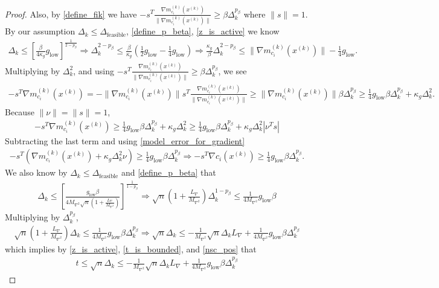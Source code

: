 \documentclass{article}
\theoremstyle{case}
\numberwithin{theorem}{subsection}
\newcommand{\dfeas}{{\Delta_{\textrm{feasible}}}}
\newcommand{\dk}{\Delta_k}
\newcommand{\gmcik}{{\nabla m_{c_i}^{(k)}\left(\xk\right)}}
\newcommand{\hgik}{{\frac{\nabla m^{(k)}_{c_i}(\xk)}{\|\nabla m^{(k)}_{c_i}(\xk)\|}}}
\newcommand{\lipgrad}{{L_{\nabla}}}
\newcommand{\maxhessian}{{M_{\nabla^2}}}
\newcommand{\mingrad}{{ g_{\textrm{low}} }}
\newcommand{\xk}{{x^{(k)}}}
\begin{document}
\begin{proof}
Also, by \cref{define_fik} we have $-s^T \hgik \ge \beta \dk^{p_{\beta}}$ where $\|s\| = 1$.
By our assumption $\dk \le \dfeas$, \cref{define_p_beta}, \cref{z_is_active} we know
\begin{align*}
\dk \le \left[\frac{\beta}{4\kappa_g}\mingrad \right]^{\frac 1 {2 - p_{\beta}}}
\Longrightarrow \dk^{2 - p_{\beta}} \le \frac{\beta}{\kappa_g}\left(\frac 1 2\mingrad  - \frac 1 4 \mingrad \right)
\Longrightarrow \frac{\kappa_g}{\beta} \dk^{2 - p_{\beta}} \le \|\gmcik\| - \frac 1 4 \mingrad.
\end{align*}
Multiplying by $\dk^2$, and using $-s^T \hgik \ge \beta \dk^{p_{\beta}}$, we see
\begin{align*}
 -s^T\gmcik =  -\|\gmcik\|s^T\hgik \ge \|\gmcik\|\beta\dk^{p_{\beta}} \ge \frac 1 4 \mingrad  \beta \dk^{p_{\beta}} + \kappa_g\dk^2.
\end{align*}
Because $\|\nu\| = \|s\| = 1$,
\begin{align*}
-s^T\gmcik \ge \frac 1 4 \mingrad  \beta \dk^{p_{\beta}} + \kappa_g\dk^2 \ge \frac 1 4 \mingrad  \beta \dk^{p_{\beta}} + \kappa_g\dk^2|\nu^T s|
\end{align*}
Subtracting the last term and using \cref{model_error_for_gradient}
\begin{align}
-s^T\left(\gmcik + \kappa_g\dk^2\nu\right) \ge \frac 1 4 \mingrad  \beta \dk ^{p_{\beta}}
\Longrightarrow -s^T\nabla c_i(\xk) \ge \frac 1 4 \mingrad  \beta \dk^{p_{\beta}}. \label{nsc_pos}
\end{align}
We also know by $\dk \le \dfeas$ and \cref{define_p_beta} that
\begin{align*}
\dk \le \left[\frac {\mingrad  \beta} {4\maxhessian\sqrt{n}\left(1 + \frac {\lipgrad} \maxhessian \right)}\right]^{\frac1 {1 - p_{\beta}} }
\Longrightarrow \sqrt{n}\left(1 + \frac {\lipgrad} \maxhessian \right) \dk^{1-p_{\beta}}\le \frac 1 {4\maxhessian} \mingrad  \beta
\end{align*}
Multiplying by $\dk^{p_{\beta}}$,
\begin{align*}
\sqrt{n}\left(1 + \frac {\lipgrad} \maxhessian \right) \dk \le \frac 1 {4\maxhessian} \mingrad  \beta \dk^{p_{\beta}}
\Longrightarrow \sqrt{n} \dk \le -\frac 1 \maxhessian \sqrt{n}\dk \lipgrad + \frac 1 {4\maxhessian} \mingrad  \beta \dk^{p_{\beta}}
\end{align*}
which implies by \cref{z_is_active}, \cref{t_is_bounded}, and \cref{nsc_pos} that
\begin{align*}
t 
\le \sqrt{n} \dk 
\le -\frac 1 \maxhessian \sqrt{n}\dk \lipgrad + \frac 1 {4\maxhessian} \mingrad \beta \dk^{p_{\beta}}

\end{align*}
\end{proof}
\end{document}
